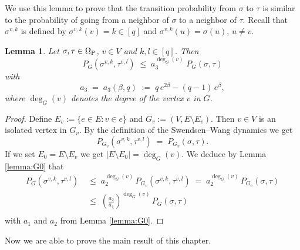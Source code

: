 \documentclass{dis}
\newtheorem{lemma}[theorem]{Lemma}
\theoremstyle{citing}
\begin{document}
We use this lemma to prove that the transition probability from 
$\sigma$ to $\tau$ is similar to the probability of going from 
a neighbor of $\sigma$ to a neighbor of $\tau$. 
Recall that $\sigma^{v,k}$ is defined by $\sigma^{v,k}(v)=k\in[q]$ and 
$\sigma^{v,k}(u)=\sigma(u)$, $u\neq v$.

\begin{lemma} \label{lemma:P}
Let $\sigma,\tau\in{\Omega}_{\rm P}$, $v\in V$ and $k,l\in[q]$.
Then
\[
P_G(\sigma^{v,k},\tau^{v,l}) \;\le\; 
a_3^{\deg_G(v)}\;
P_G(\sigma,\tau)
\]
with
\[
a_3 \;=\; a_3(\beta,q) \;:=\; q\,e^{2\beta} - (q-1)\,e^\beta,
\]
where $\deg_G(v)$ denotes the degree of the vertex $v$ in $G$.
\end{lemma}

\begin{proof}
Define $E_v:=\{e\in E: v\in e\}$ and $G_v:=(V,E\setminus E_v)$. 
Then $v\in V$ is an isolated vertex in $G_v$. 
By the definition of the Swendsen--Wang dynamics we get  
\[
P_{G_v}(\sigma^{v,k},\tau^{v,l}) 
\;=\; P_{G_v}(\sigma,\tau).
\]
If we set $E_0=E\setminus E_v$ we get 
${\left\vert {E\setminus E_0} \right\vert}=\deg_G(v)$. 
We deduce by Lemma \ref{lemma:G0} that
\[\begin{split}
P_{G}(\sigma^{v,k},\tau^{v,l}) 
\;&\le\; a_2^{\deg_G(v)}\,P_{G_v}(\sigma^{v,k},\tau^{v,l})
\;=\; a_2^{\deg_G(v)}\,P_{G_v}(\sigma,\tau) \\
&\le\;\left(\frac{a_2}{a_1}\right)^{\deg_G(v)}\,P_{G}(\sigma,\tau)\\
\end{split}\]
with $a_1$ and $a_2$ from Lemma \ref{lemma:G0}.
\end{proof}

Now we are able to prove the main result of this chapter.
\end{document}

